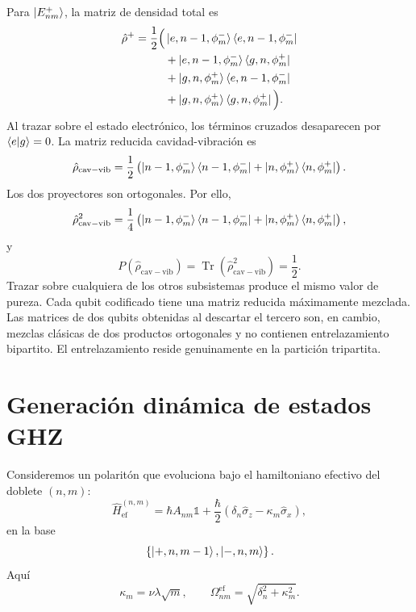 \documentclass[11pt]{article}
\newcommand{\Id}{\mathds{1}}
\begin{document}
Para $\ket{E_{nm}^{+}}$, la matriz de densidad total es
\begin{equation}
\begin{aligned}
  \hat\rho^{+}
  =\frac12\Big(&
  \ket{e,n-1,\phi_m^{-}}\bra{e,n-1,\phi_m^{-}}
  \\
  &+
  \ket{e,n-1,\phi_m^{-}}\bra{g,n,\phi_m^{+}}
  \\
  &+
  \ket{g,n,\phi_m^{+}}\bra{e,n-1,\phi_m^{-}}
  \\
  &+
  \ket{g,n,\phi_m^{+}}\bra{g,n,\phi_m^{+}}
  \Big).
\end{aligned}
\end{equation}
Al trazar sobre el estado electr\'onico, los t\'erminos cruzados desaparecen
por $\braket{e|g}=0$. La matriz reducida cavidad-vibraci\'on es
\begin{equation}
  \hat\rho_{\mathrm{cav-vib}}
  =
  \frac12
  \left(
  \ket{n-1,\phi_m^{-}}\bra{n-1,\phi_m^{-}}
  +
  \ket{n,\phi_m^{+}}\bra{n,\phi_m^{+}}
  \right).
\end{equation}
Los dos proyectores son ortogonales. Por ello,
\begin{equation}
  \hat\rho_{\mathrm{cav-vib}}^2
  =
  \frac14
  \left(
  \ket{n-1,\phi_m^{-}}\bra{n-1,\phi_m^{-}}
  +
  \ket{n,\phi_m^{+}}\bra{n,\phi_m^{+}}
  \right),
\end{equation}
y
\begin{equation}
  \boxed{
  P(\hat\rho_{\mathrm{cav-vib}})
  =
  \operatorname{Tr}(\hat\rho_{\mathrm{cav-vib}}^2)
  =
  \frac12.
  }
\end{equation}
Trazar sobre cualquiera de los otros subsistemas produce el mismo valor de
pureza. Cada qubit codificado tiene una matriz reducida m\'aximamente mezclada.
Las matrices de dos qubits obtenidas al descartar el tercero son, en cambio,
mezclas cl\'asicas de dos productos ortogonales y no contienen
entrelazamiento bipartito. El entrelazamiento reside genuinamente en la
partici\'on tripartita.

\section{Generaci\'on din\'amica de estados GHZ}

Consideremos un polarit\'on que evoluciona bajo el hamiltoniano efectivo del
doblete $(n,m)$:
\begin{equation}
  \hat H_{\mathrm{ef}}^{(n,m)}
  =
  \hbar A_{nm}\Id
  +
  \frac{\hbar}{2}
  \left(
  \delta_n\hat\sigma_z
  -
  \kappa_m\hat\sigma_x
  \right),
\end{equation}
en la base
\begin{equation}
  \left\{
  \ket{+,n,m-1},
  \ket{-,n,m}
  \right\}.
\end{equation}
Aqu\'i
\begin{equation}
  \kappa_m=\nu\lambda\sqrt m,
  \qquad
  \Omega_{nm}^{\mathrm{ef}}
  =
  \sqrt{\delta_n^2+\kappa_m^2}.
\end{equation}
\end{document}
